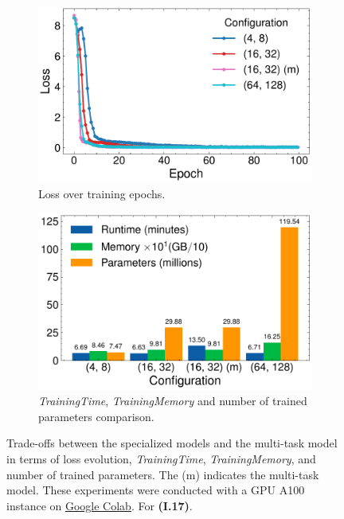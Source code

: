 \documentclass{article}
\begin{document}
\begin{figure}[h]
    \centering
    \begin{subfigure}{0.45\textwidth}
        \includegraphics[width=0.9\linewidth]{../images/I.17 Results_A100_loss.pdf}
        \caption{Loss over training epochs. \vspace{3.5mm}}
    \end{subfigure}
    \hfill
    \begin{subfigure}{0.45\textwidth}
        \includegraphics[width=0.9\linewidth]{../images/I.17 Results_A100_metrics.pdf}
        \caption{\emph{TrainingTime}, \emph{TrainingMemory} and number of trained parameters comparison.}
    \end{subfigure}
    \caption{Trade-offs between the specialized models and the multi-task model in terms of loss evolution, \emph{TrainingTime}, \emph{TrainingMemory}, and number of trained parameters. The (m) indicates the multi-task model. These experiments were conducted with a GPU A100 instance on \href{https://colab.research.google.com/}{Google Colab}. For \textbf{(I.17)}.}
    \label{fig:I.17-A100-results}
\end{figure}
\end{document}
